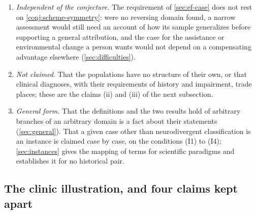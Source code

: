 \begin{enumerate}[label=(\roman*), leftmargin=*, nosep]
\item \emph{Independent of the conjecture.} The requirement of \autoref{sec:ef-case} does not rest on \autoref{conj:scheme-symmetry}: were no reversing domain found, a narrow assessment would still need an account of how its sample generalizes before supporting a general attribution, and the case for the assistance or environmental change a person wants would not depend on a compensating advantage elsewhere (\autoref{sec:difficulties}).
\item \emph{Not claimed.} That the populations have no structure of their own, or that clinical diagnoses, with their requirements of history and impairment, trade places; these are the claims (ii) and (iii) of the next subsection.
\item \emph{General form.} That the definitions and the two results hold of arbitrary branches of an arbitrary domain is a fact about their statements (\autoref{sec:general}). That a given case other than neurodivergent classification is an instance is claimed case by case, on the conditions (I1) to (I4); \autoref{sec:instances} gives the mapping of terms for scientific paradigms and establishes it for no historical pair.
\end{enumerate}

\subsection{The clinic illustration, and four claims kept apart}
\label{sec:redrawing}

